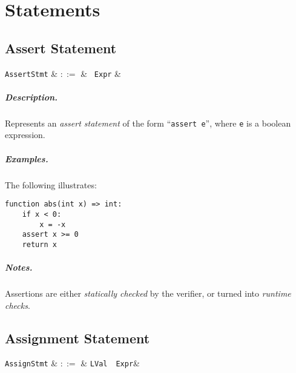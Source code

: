\chapter{Statements}


\section{Assert Statement}

\begin{syntax}
  \verb+AssertStmt+ & $::=$ & \ \verb+Expr+ &\\
\end{syntax}

\paragraph{Description.}  Represents an {\em assert statement} of the form
``\lstinline{assert e}'', where \lstinline{e} is a boolean expression. 

\paragraph{Examples.} The following illustrates:
\begin{lstlisting}
function abs(int x) => int:
    if x < 0:
        x = -x
    assert x >= 0
    return x
\end{lstlisting}

\paragraph{Notes.}  Assertions are either {\em statically checked} by the
verifier, or turned into {\em runtime checks}.



\section{Assignment Statement}

\begin{syntax}
  \verb+AssignStmt+ & $::=$ & \verb+LVal+\ \token{=}\ \verb+Expr+&\\
\end{syntax}

